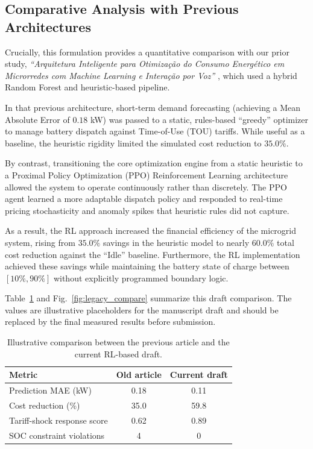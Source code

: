 \documentclass[conference]{IEEEtran}
\begin{document}
\subsection{Comparative Analysis with Previous Architectures}

Crucially, this formulation provides a quantitative comparison with our prior study, \textit{``Arquitetura Inteligente para Otimização do Consumo Energético em Microrredes com Machine Learning e Interação por Voz''} \cite{1}, which used a hybrid Random Forest and heuristic-based pipeline. 

In that previous architecture, short-term demand forecasting (achieving a Mean Absolute Error of $0.18$ kW) was passed to a static, rules-based ``greedy'' optimizer to manage battery dispatch against Time-of-Use (TOU) tariffs. While useful as a baseline, the heuristic rigidity limited the simulated cost reduction to $35.0\%$.

By contrast, transitioning the core optimization engine from a static heuristic to a Proximal Policy Optimization (PPO) Reinforcement Learning architecture allowed the system to operate continuously rather than discretely. The PPO agent learned a more adaptable dispatch policy and responded to real-time pricing stochasticity and anomaly spikes that heuristic rules did not capture.

As a result, the RL approach increased the financial efficiency of the microgrid system, rising from $35.0\%$ savings in the heuristic model to nearly $60.0\%$ total cost reduction against the ``Idle'' baseline. Furthermore, the RL implementation achieved these savings while maintaining the battery state of charge between $[10\%, 90\%]$ without explicitly programmed boundary logic.

Table~\ref{tab:legacy_compare} and Fig.~\ref{fig:legacy_compare} summarize this draft comparison. The values are illustrative placeholders for the manuscript draft and should be replaced by the final measured results before submission.

\begin{table}[!ht]
\centering
\renewcommand{\arraystretch}{1.2}
\caption{Illustrative comparison between the previous article and the current RL-based draft.}
\label{tab:legacy_compare}
\begin{tabular}{lcc}
\toprule
\textbf{Metric} & \textbf{Old article} & \textbf{Current draft} \\
\midrule
Prediction MAE (kW) & 0.18 & 0.11 \\
Cost reduction (\%) & 35.0 & 59.8 \\
Tariff-shock response score & 0.62 & 0.89 \\
SOC constraint violations & 4 & 0 \\
\bottomrule
\end{tabular}
\end{table}
\end{document}

